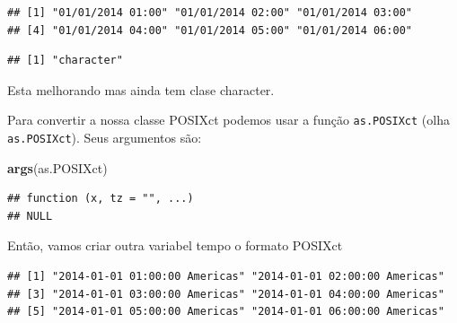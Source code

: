 \documentclass[]{book}
\newenvironment{Shaded}{\begin{snugshade}}{\end{snugshade}}
\newcommand{\KeywordTok}[1]{\textcolor[rgb]{0.13,0.29,0.53}{\textbf{#1}}}
\newcommand{\DataTypeTok}[1]{\textcolor[rgb]{0.13,0.29,0.53}{#1}}
\newcommand{\StringTok}[1]{\textcolor[rgb]{0.31,0.60,0.02}{#1}}
\newcommand{\OperatorTok}[1]{\textcolor[rgb]{0.81,0.36,0.00}{\textbf{#1}}}
\newcommand{\NormalTok}[1]{#1}
\begin{document}
\begin{verbatim}
## [1] "01/01/2014 01:00" "01/01/2014 02:00" "01/01/2014 03:00"
## [4] "01/01/2014 04:00" "01/01/2014 05:00" "01/01/2014 06:00"
\end{verbatim}

\begin{Shaded}
\end{Shaded}

\begin{verbatim}
## [1] "character"
\end{verbatim}

Esta melhorando mas ainda tem clase character.

Para convertir a nossa classe POSIXct podemos usar a função
\texttt{as.POSIXct} (olha \texttt{as.POSIXct}). Seus argumentos são:

\begin{Shaded}
\begin{Highlighting}[]
\KeywordTok{args}\NormalTok{(as.POSIXct)}
\end{Highlighting}
\end{Shaded}

\begin{verbatim}
## function (x, tz = "", ...) 
## NULL
\end{verbatim}

Então, vamos criar outra variabel tempo o formato POSIXct

\begin{Shaded}
\end{Shaded}

\begin{verbatim}
## [1] "2014-01-01 01:00:00 Americas" "2014-01-01 02:00:00 Americas"
## [3] "2014-01-01 03:00:00 Americas" "2014-01-01 04:00:00 Americas"
## [5] "2014-01-01 05:00:00 Americas" "2014-01-01 06:00:00 Americas"
\end{verbatim}
\end{document}

